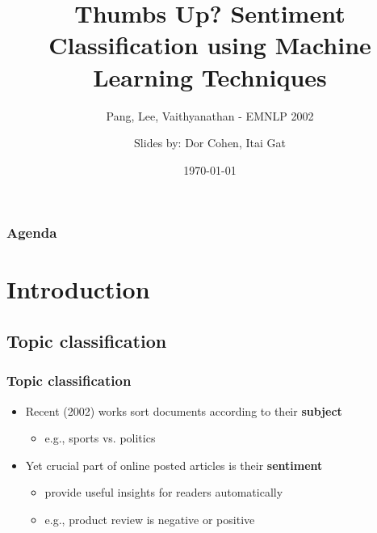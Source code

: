 \documentclass{beamer}
\title{Thumbs Up? Sentiment Classification using Machine Learning Techniques}
\subtitle{Pang, Lee, Vaithyanathan - EMNLP 2002}
\author{Slides by: Dor Cohen, Itai Gat}
\institute{IE @ Technion}
\date{\today}
\begin{document}
\begin{frame}
	\titlepage
\end{frame}

\begin{frame}
	\frametitle{Agenda}
	\tableofcontents
\end{frame}

\section{Introduction}
\subsection{Topic classification}

\begin{frame}
	\frametitle{Topic classification}
	\begin{itemize}
	\item Recent (2002) works sort documents according to their \textbf{subject}
	\begin{itemize}
		\item e.g., sports vs. politics
	\end{itemize}
	\pause
	\item Yet crucial part of online posted articles is their \textbf{sentiment}
	\begin{itemize}
		\item provide useful insights for readers automatically
		\item e.g., product review is negative or positive
	\end{itemize}

	\end{itemize}
\end{frame}

\end{document}
